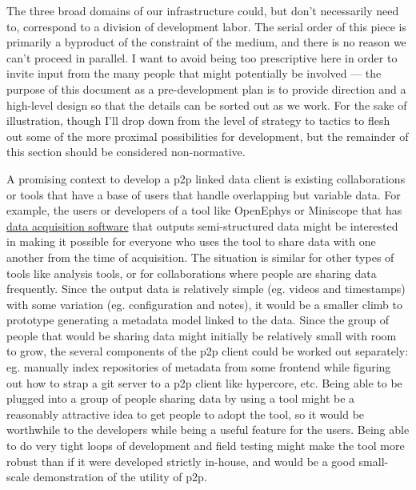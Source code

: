 The three broad domains of our infrastructure could, but don't
necessarily need to, correspond to a division of development labor. The
serial order of this piece is primarily a byproduct of the constraint of
the medium, and there is no reason we can't proceed in parallel. I want
to avoid being too prescriptive here in order to invite input from the
many people that might potentially be involved --- the purpose of this
document as a pre-development plan is to provide direction and a
high-level design so that the details can be sorted out as we work. For
the sake of illustration, though I'll drop down from the level of
strategy to tactics to flesh out some of the more proximal possibilities
for development, but the remainder of this section should be considered
non-normative.

A promising context to develop a p2p linked data client is existing
collaborations or tools that have a base of users that handle
overlapping but variable data. For example, the users or developers of a
tool like OpenEphys \citep{siegleOpenEphysOpensource2017}  or
Miniscope \citep{aharoniAllLightThat2019}  that has
\href{http://miniscope.org/index.php/Data_Acquisition_Software}{data
acquisition software} that outputs semi-structured data might be
interested in making it possible for everyone who uses the tool to share
data with one another from the time of acquisition. The situation is
similar for other types of tools like analysis tools, or for
collaborations where people are sharing data frequently. Since the
output data is relatively simple (eg. videos and timestamps) with some
variation (eg. configuration and notes), it would be a smaller climb to
prototype generating a metadata model linked to the data. Since the
group of people that would be sharing data might initially be relatively
small with room to grow, the several components of the p2p client could
be worked out separately: eg. manually index repositories of metadata
from some frontend while figuring out how to strap a git server to a p2p
client like hypercore, etc. Being able to be plugged into a group of
people sharing data by using a tool might be a reasonably attractive
idea to get people to adopt the tool, so it would be worthwhile to the
developers while being a useful feature for the users. Being able to do
very tight loops of development and field testing might make the tool
more robust than if it were developed strictly in-house, and would be a
good small-scale demonstration of the utility of p2p.

